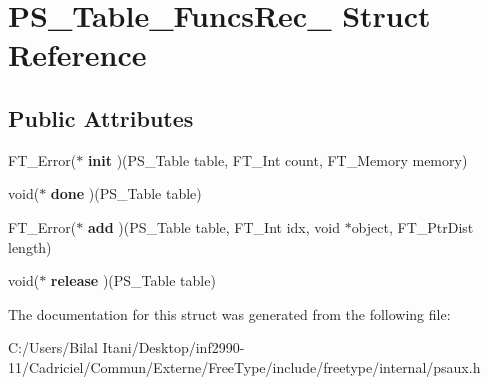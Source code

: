 \hypertarget{struct_p_s___table___funcs_rec__}{}\section{P\+S\+\_\+\+Table\+\_\+\+Funcs\+Rec\+\_\+ Struct Reference}
\label{struct_p_s___table___funcs_rec__}
\subsection*{Public Attributes}
\begin{DoxyCompactItemize}
\item 
F\+T\+\_\+\+Error($\ast$ {\bfseries init} )(P\+S\+\_\+\+Table table, F\+T\+\_\+\+Int count, F\+T\+\_\+\+Memory memory)\hypertarget{struct_p_s___table___funcs_rec___a5ac6b9ff3cb3bec352235cecea5c6def}{}\label{struct_p_s___table___funcs_rec___a5ac6b9ff3cb3bec352235cecea5c6def}

\item 
void($\ast$ {\bfseries done} )(P\+S\+\_\+\+Table table)\hypertarget{struct_p_s___table___funcs_rec___ae358c8c8f5ae26f58c136993ddac6276}{}\label{struct_p_s___table___funcs_rec___ae358c8c8f5ae26f58c136993ddac6276}

\item 
F\+T\+\_\+\+Error($\ast$ {\bfseries add} )(P\+S\+\_\+\+Table table, F\+T\+\_\+\+Int idx, void $\ast$object, F\+T\+\_\+\+Ptr\+Dist length)\hypertarget{struct_p_s___table___funcs_rec___a007697f5aebe1dc71b2a3e01d152a9b5}{}\label{struct_p_s___table___funcs_rec___a007697f5aebe1dc71b2a3e01d152a9b5}

\item 
void($\ast$ {\bfseries release} )(P\+S\+\_\+\+Table table)\hypertarget{struct_p_s___table___funcs_rec___aa593cc617f0caf908d7d7f3dd770fab5}{}\label{struct_p_s___table___funcs_rec___aa593cc617f0caf908d7d7f3dd770fab5}

\end{DoxyCompactItemize}


The documentation for this struct was generated from the following file\+:\begin{DoxyCompactItemize}
\item 
C\+:/\+Users/\+Bilal Itani/\+Desktop/inf2990-\/11/\+Cadriciel/\+Commun/\+Externe/\+Free\+Type/include/freetype/internal/psaux.\+h\end{DoxyCompactItemize}
